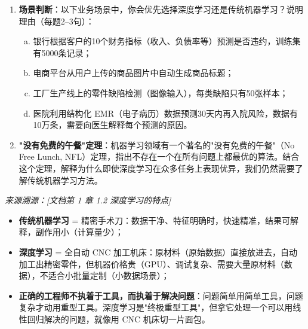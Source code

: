 \documentclass[a4paper,11pt]{ctexart}
\begin{document}
\begin{problembox}
\begin{enumerate}[(1)]
        \item \textbf{场景判断}：以下业务场景中，你会优先选择深度学习还是传统机器学习？说明理由（每题2--3句）：
        \begin{enumerate}[a.]
            \item 银行根据客户的10个财务指标（收入、负债率等）预测是否违约，训练集有5000条记录；
            \item 电商平台从用户上传的商品图片中自动生成商品标题；
            \item 工厂生产线上的零件缺陷检测（图像输入），每类缺陷只有50张样本；
            \item 医院利用结构化 EMR（电子病历）数据预测30天内再入院风险，数据有10万条，需要向医生解释每个预测的原因。
        \end{enumerate}

        \item \textbf{"没有免费的午餐"定理}：机器学习领域有一个著名的"没有免费的午餐"（No Free Lunch, NFL）定理，指出不存在一个在所有问题上都最优的算法。结合这个定理，解释为什么即使深度学习在众多任务上表现优异，我们仍然需要了解传统机器学习方法。
    \end{enumerate}

    \vspace{0.2cm}
    {\color{gray}\small\textit{来源溯源：[文档第 1 章 1.2 深度学习的特点]}}
\end{problembox}

\begin{metaphorbox}
    \begin{itemize}
        \item \textbf{传统机器学习} = 精密手术刀：数据干净、特征明确时，快速精准，结果可解释，副作用小（计算量少）；
        \item \textbf{深度学习} = 全自动 CNC 加工机床：原材料（原始数据）直接放进去，自动加工出精密零件，但机器价格贵（GPU）、调试复杂、需要大量原材料（数据），不适合小批量定制（小数据场景）；
        \item \textbf{正确的工程师不执着于工具，而执着于解决问题}：问题简单用简单工具，问题复杂才动用重型工具。深度学习是"终极重型工具"，但拿它处理一个可以用线性回归解决的问题，就像用 CNC 机床切一片面包。
    \end{itemize}
\end{metaphorbox}
\end{document}
